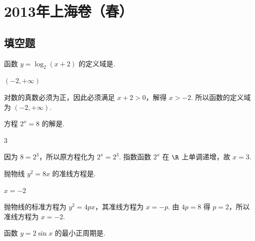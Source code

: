 
\chapter{2013年上海卷（春）}

\section{填空题}

\begin{problem}
函数 \( y = \log_{2}(x + 2) \) 的定义域是\fillinblank{}.
\end{problem}

\begin{answer}
\( (-2, +\infty) \)
\end{answer}

\begin{solution}
对数的真数必须为正，因此必须满足 \(x+2>0\)，解得 \(x>-2\). 所以函数的定义域为 \((-2,+\infty)\).
\end{solution}

\begin{problem}
方程 \( 2^{x}=8 \) 的解是\fillinblank{}.
\end{problem}

\begin{answer}
\(3\)
\end{answer}

\begin{solution}
因为 \(8=2^3\)，所以原方程化为 \(2^x=2^3\). 指数函数 \(2^x\) 在 \(\R\) 上单调递增，故 \(x=3\).
\end{solution}

\begin{problem}
抛物线 \( y^{2}=8x \) 的准线方程是\fillinblank{}.
\end{problem}

\begin{answer}
\(x=-2\)
\end{answer}

\begin{solution}
抛物线的标准方程为 \(y^2=4px\)，其准线方程为 \(x=-p\). 由 \(4p=8\) 得 \(p=2\)，所以准线方程为 \(x=-2\).
\end{solution}

\begin{problem}
函数 \( y = 2 \sin x \) 的最小正周期是\fillinblank{}.
\end{problem}

